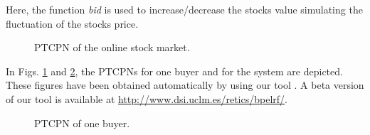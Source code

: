 Here, the function {\it bid} is used to increase/decrease the stocks value simulating the fluctuation of the stocks price.

\begin{figure}[h]
\vspace{-0.4cm}
\caption{PTCPN of the online stock market.}\label{sistema}
\end{figure}
In Figs. \ref{sistema} and \ref{proceso}, the PTCPNs for one buyer and for the system are depicted.  These figures have been obtained automatically by using our tool \cite{Maria2012}. A beta version of our tool is available at \url{http://www.dsi.uclm.es/retics/bpelrf/}.
\begin{figure}[h]
\vspace{-0.4cm}
\caption{PTCPN of one buyer.}\label{proceso}
\end{figure}

